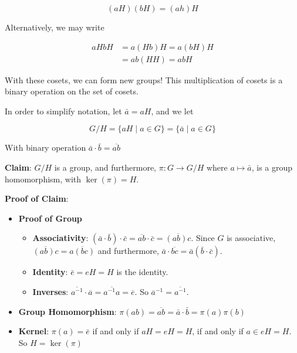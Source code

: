 \documentclass[12pt]{article}
\begin{document}
\[
  (aH)(bH) = (ah) H
\]

Alternatively, we may write

\begin{align*}
  aH bH &= a(Hb)H = a(bH)H \\
        &= ab (HH) = abH
\end{align*}

With these cosets, we can form new groups! This multiplication of cosets is a
binary operation on the set of cosets.

In order to simplify notation, let $\bar a = a H$, and we let

\[
  G / H = \{aH \mid a \in G\} = \{\bar a \mid a \in G \}
\]

With binary operation $\bar a \cdot \bar b = \overline{ab}$

{\bf Claim}: $G / H$ is a group, and furthermore, $\pi: G \to G / H$ where $a
\mapsto \bar a$, is a group homomorphism, with $\ker(\pi) = H$.


{\bf Proof of Claim}:

\begin{itemize}
  \item {\bf Proof of Group}

    \begin{itemize}
      \item {\bf Associativity}: $(\bar a \cdot \bar b) \cdot \bar c = \overline
        {ab} \cdot \bar c = \overline{(ab)c}$. Since $G$ is associative,
        $\overline{(ab)c} = \overline{a(bc)}$ and furthermore, $\bar a \cdot
        \overline{bc} = \bar a (\bar b \cdot \bar c)$.

      \item {\bf Identity}: $\bar e = eH = H$ is the identity.
      \item {\bf Inverses}: $\overline{a^{-1}} \cdot \overline{a} =
        \overline{a^{-1} a} = \overline{e}$. So $\overline{a}^{-1} =
        \overline{a^{-1}}$.
    \end{itemize}

  \item {\bf Group Homomorphism}: $\pi(ab) = \overline{ab} = \bar a \cdot \bar b
    = \pi(a) \pi(b)$

  \item {\bf Kernel}: $\pi(a) = \bar e$ if and only if $aH = eH = H$, if and
    only if $a \in eH = H$. So $H = \ker(\pi)$
\end{itemize}
\end{document}
